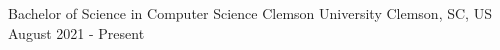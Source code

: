 

\begin{cventries}

  \cventry
    {Bachelor of Science in Computer Science} %
    {Clemson University} %
    {Clemson, SC, US} %
    {August 2021 - Present} %
    {
    }

\end{cventries}
